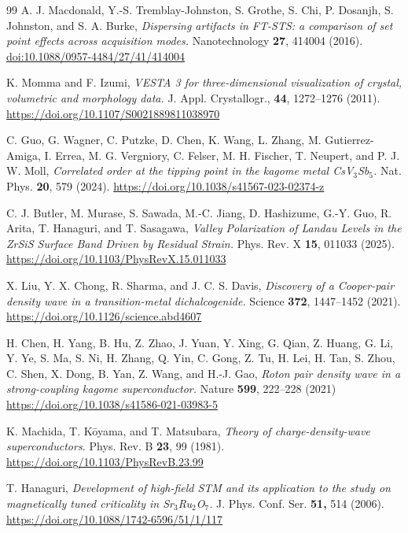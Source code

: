 \documentclass[reprint,superscriptaddress,prb,aps]{revtex4-2}
\begin{document}
\begin{thebibliography}{99}
A. J. Macdonald, Y.-S. Tremblay-Johnston, S. Grothe, S. Chi, P. Dosanjh, S. Johnston, and S. A. Burke,
\textit{Dispersing artifacts in FT-STS: a comparison of set point effects across acquisition modes.}
Nanotechnology \textbf{27}, 414004 (2016).
\url{doi:10.1088/0957-4484/27/41/414004}


K. Momma and F. Izumi,
\textit{VESTA 3 for three-dimensional visualization of crystal, volumetric and morphology data.}
J. Appl. Crystallogr., \textbf{44}, 1272--1276 (2011).
\url{https://doi.org/10.1107/S0021889811038970}


C. Guo, G. Wagner, C. Putzke, D. Chen, K. Wang, L. Zhang, M. Gutierrez-Amiga, I. Errea, M. G. Vergniory, C. Felser, M. H. Fischer, T. Neupert, and P. J. W. Moll,
\textit{Correlated order at the tipping point in the kagome metal CsV$_{3}$Sb$_{5}$.}
Nat. Phys. \textbf{20}, 579 (2024).
\url{https://doi.org/10.1038/s41567-023-02374-z}


C. J. Butler, M. Murase, S. Sawada, M.-C. Jiang, D. Hashizume, G.-Y. Guo, R. Arita, T. Hanaguri, and T. Sasagawa,
\textit{Valley Polarization of Landau Levels in the ZrSiS Surface Band Driven by Residual Strain.}
Phys. Rev. X \textbf{15}, 011033 (2025).
\url{https://doi.org/10.1103/PhysRevX.15.011033}


X. Liu, Y. X. Chong, R. Sharma, and J. C. S. Davis,
\textit{Discovery of a Cooper-pair density wave in a transition-metal dichalcogenide.}
Science \textbf{372}, 1447--1452 (2021).
\url{https://doi.org/10.1126/science.abd4607}


H. Chen, H. Yang, B. Hu, Z. Zhao, J. Yuan, Y. Xing, G. Qian, Z. Huang, G. Li, Y. Ye, S. Ma, S. Ni, H. Zhang, Q. Yin, C. Gong, Z. Tu, H. Lei, H. Tan, S. Zhou, C. Shen, X. Dong, B. Yan, Z. Wang, and H.-J. Gao,
\textit{Roton pair density wave in a strong-coupling kagome superconductor.}
Nature \textbf{599}, 222--228 (2021)
\url{https://doi.org/10.1038/s41586-021-03983-5}









K. Machida, T. K\={o}yama, and T. Matsubara,
\textit{Theory of charge-density-wave superconductors.}
Phys. Rev. B \textbf{23}, 99 (1981).
\url{https://doi.org/10.1103/PhysRevB.23.99}


T. Hanaguri,
\textit{Development of high-field STM and its application to the study on magnetically tuned criticality in Sr$_{3}$Ru$_{2}$O$_{7}$.}
J. Phys. Conf. Ser. \textbf{51,} 514 (2006).
\url{https://doi.org/10.1088/1742-6596/51/1/117}



\end{thebibliography}
\end{document}
